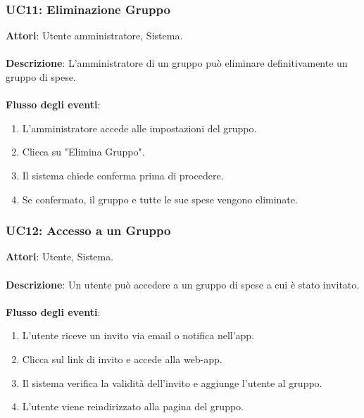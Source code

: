 \subsubsection{UC11: Eliminazione Gruppo}
\textbf{Attori}: Utente amministratore, Sistema.
\\
\\
\textbf{Descrizione}: L’amministratore di un gruppo può eliminare definitivamente un gruppo di spese.
\\
\\
\textbf{Flusso degli eventi}:
\begin{enumerate}
    \item L’amministratore accede alle impostazioni del gruppo.
    \item Clicca su "Elimina Gruppo".
    \item Il sistema chiede conferma prima di procedere.
    \item Se confermato, il gruppo e tutte le sue spese vengono eliminate.
\end{enumerate}

\subsubsection{UC12: Accesso a un Gruppo}
\textbf{Attori}: Utente, Sistema.
\\
\\
\textbf{Descrizione}: Un utente può accedere a un gruppo di spese a cui è stato invitato.
\\
\\
\textbf{Flusso degli eventi}:
\begin{enumerate}
    \item L'utente riceve un invito via email o notifica nell’app.
    \item Clicca sul link di invito e accede alla web-app.
    \item Il sistema verifica la validità dell’invito e aggiunge l’utente al gruppo.
    \item L'utente viene reindirizzato alla pagina del gruppo.
\end{enumerate}